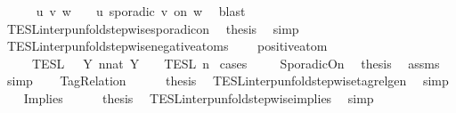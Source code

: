 \begin{isabellebody}
\ \ \ \ \isamarkupfalse%
\ u\ v\ w\ \ {\isacartoucheopen}{\isasymphi}\ {\isacharequal}\ {\isacharparenleft}u\ sporadic\ v\ on\ w{\isacharparenright}{\isacartoucheclose}\ \isamarkupfalse%
\ blast\isanewline
\ \ \isamarkupfalse%
\ TESL{\isacharunderscore}interp{\isacharunderscore}unfold{\isacharunderscore}stepwise{\isacharunderscore}sporadicon\ \isamarkupfalse%
\ {\isacharquery}thesis\ \isamarkupfalse%
\ simp\isanewline
{}\isamarkupfalse%
%
\endisatagproof
{\isafoldproof}%
%
\isadelimproof
\isanewline
%
\endisadelimproof
\isanewline
{}\isamarkupfalse%
\ TESL{\isacharunderscore}interp{\isacharunderscore}unfold{\isacharunderscore}stepwise{\isacharunderscore}negative{\isacharunderscore}atoms{\isacharcolon}\isanewline
\ \ \ {\isacartoucheopen}{\isasymnot}\ positive{\isacharunderscore}atom\ {\isasymphi}{\isacartoucheclose}\isanewline
\ \ \ {\isacartoucheopen}{\isasymlbrakk}\ {\isasymphi}\ {\isasymrbrakk}\isactrlsub T\isactrlsub E\isactrlsub S\isactrlsub L\ {\isacharequal}\ {\isasymInter}\ {\isacharbraceleft}Y{\isachardot}\ {\isasymexists}n{\isacharcolon}{\isacharcolon}nat{\isachardot}\ Y\ {\isacharequal}\ {\isasymlbrakk}\ {\isasymphi}\ {\isasymrbrakk}\isactrlsub T\isactrlsub E\isactrlsub S\isactrlsub L\isactrlbsup {\isasymge}\ n\isactrlesup {\isacharbraceright}{\isacartoucheclose}\isanewline
%
\isadelimproof
%
\endisadelimproof
%
\isatagproof
{}\isamarkupfalse%
\ {\isacharparenleft}cases\ {\isasymphi}{\isacharparenright}\isanewline
\ \ \isamarkupfalse%
\ SporadicOn\ \isamarkupfalse%
\ {\isacharquery}thesis\ \isamarkupfalse%
\ assms\ \isamarkupfalse%
\ simp\isanewline
{}\isamarkupfalse%
\isanewline
\ \ \isamarkupfalse%
\ TagRelation\isanewline
\ \ \ \ \isamarkupfalse%
\ {\isacharquery}thesis\ \isamarkupfalse%
\ TESL{\isacharunderscore}interp{\isacharunderscore}unfold{\isacharunderscore}stepwise{\isacharunderscore}tagrelgen\ \isamarkupfalse%
\ simp\isanewline
{}\isamarkupfalse%
\isanewline
\ \ \isamarkupfalse%
\ Implies\isanewline
\ \ \ \ \isamarkupfalse%
\ {\isacharquery}thesis\ \isamarkupfalse%
\ TESL{\isacharunderscore}interp{\isacharunderscore}unfold{\isacharunderscore}stepwise{\isacharunderscore}implies\ \isamarkupfalse%
\ simp\isanewline
{}\isamarkupfalse%

\end{isabellebody}
